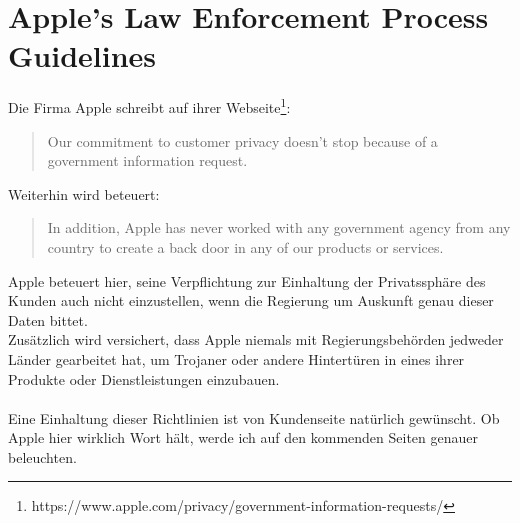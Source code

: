\section{Apple's Law Enforcement Process Guidelines}
	Die Firma Apple schreibt auf ihrer
	Webseite\footnote{https://www.apple.com/privacy/government-information-requests/}:
	\begin{quote}
	Our commitment to customer privacy doesn't stop because of a government
	information request.
	\end{quote}
	Weiterhin wird beteuert:
	\begin{quote}
	In addition, Apple has never worked with any government agency from any country to create a back 
	door in any of our products or services.
	\end{quote}
	Apple beteuert hier, seine Verpflichtung zur Einhaltung der Privatssphäre des
	Kunden auch nicht einzustellen, wenn die Regierung um Auskunft genau dieser
	Daten bittet.\\
	Zusätzlich wird versichert, dass Apple niemals mit Regierungsbehörden
	jedweder Länder gearbeitet hat, um Trojaner oder andere Hintertüren in eines
	ihrer Produkte oder Dienstleistungen einzubauen.\\\\
	Eine Einhaltung dieser Richtlinien ist von Kundenseite natürlich gewünscht.
	Ob Apple hier wirklich Wort hält, werde ich auf den kommenden Seiten genauer
	beleuchten.
